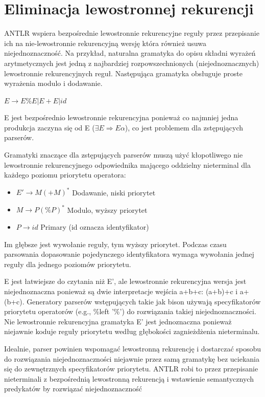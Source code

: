 \section{Eliminacja lewostronnej rekurencji}
ANTLR wspiera bezpośrednie lewostronnie rekurencyjne reguły przez przepisanie ich
na nie-lewostronnie rekurencyjną wersję która również usuwa niejednoznaczność.
Na przykład, naturalna gramatyka do opisu składni wyrażeń arytmetycznych
jest jedną z najbardziej rozpowszechnionych (niejednoznacznych)
lewostronnie rekurencyjnych reguł. Następująca gramatyka obsługuje proste wyrażenia modulo i dodawanie.
\par
$E \rightarrow E\%E | E+E | id$
\par
E jest bezpośrednio lewostronnie rekurencyjna ponieważ co najmniej jedna produkcja zaczyna się od 
E ($\exists E \Rightarrow E\alpha$), co jest problemem dla zstępujących parserów.
\par
Gramatyki znaczące dla zstępujących parserów muszą użyć kłopotliwego 
nie lewostronnie rekurencyjnego odpowiednika mającego oddzielny
nieterminal dla każdego poziomu priorytetu operatora:
\begin{itemize}
\item $E' \rightarrow M (+ M)^*$ Dodawanie, niski priorytet
\item $M \rightarrow P (\% P)^*$ Modulo, wyższy priorytet
\item $P \rightarrow id$ Primary (id oznacza identyfikator)
\end{itemize}
Im głębsze jest wywołanie reguły, tym wyższy priorytet.
Podczas czasu parsowania dopasowanie pojedynczego identyfikatora
wymaga wywołania jednej reguły dla jednego poziomów priorytetu.
\par
E jest łatwiejsze do czytania niż E', ale lewostronnie rekurencyjna wersja jest
niejednoznaczna ponieważ są dwie interpretacje wejścia a+b+c:
(a+b)+c i a+(b+c). Generatory parserów wstępujących takie jak bison 
używają specyfikatorów priorytetu operatorów (e.g., \%left '\%') do
rozwiązania takiej niejednoznaczności.
Nie lewostronnie rekurencyjna gramatyka E'
jest jednoznaczna ponieważ niejawnie koduje reguły priorytetu
według głębokości zagnieżdżenia nieterminalu.
\par
Idealnie, parser powinien wspomagać lewostronną rekurencję i
dostarczać sposobu do rozwiązania niejednoznaczności niejawnie 
przez samą gramatykę bez uciekania się do zewnętrznych specyfikatorów priorytetu.
ANTLR robi to przez przepisanie nieterminali z bezpośrednią lewostronną rekurencją 
i wstawienie semantycznych predykatów by rozwiązać niejednoznaczność
